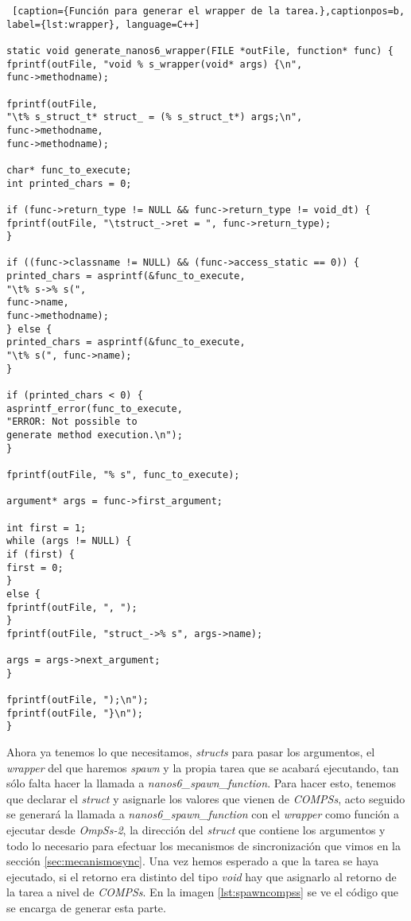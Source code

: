 \begin{lstlisting} [caption={Función para generar el wrapper de la tarea.},captionpos=b, label={lst:wrapper}, language=C++]

static void generate_nanos6_wrapper(FILE *outFile, function* func) {
fprintf(outFile, "void % s_wrapper(void* args) {\n", 
func->methodname);

fprintf(outFile, 
"\t% s_struct_t* struct_ = (% s_struct_t*) args;\n", 
func->methodname, 
func->methodname);

char* func_to_execute;
int printed_chars = 0;

if (func->return_type != NULL && func->return_type != void_dt) {
fprintf(outFile, "\tstruct_->ret = ", func->return_type);
}

if ((func->classname != NULL) && (func->access_static == 0)) {
printed_chars = asprintf(&func_to_execute, 
"\t% s->% s(", 
func->name, 
func->methodname);
} else {
printed_chars = asprintf(&func_to_execute, 
"\t% s(", func->name);
}

if (printed_chars < 0) {
asprintf_error(func_to_execute, 
"ERROR: Not possible to 
generate method execution.\n");
}

fprintf(outFile, "% s", func_to_execute);

argument* args = func->first_argument;

int first = 1;
while (args != NULL) {
if (first) {
first = 0;
}
else {
fprintf(outFile, ", ");
}
fprintf(outFile, "struct_->% s", args->name);

args = args->next_argument;
}

fprintf(outFile, ");\n");
fprintf(outFile, "}\n");
}  
\end{lstlisting}
\par\bigskip

Ahora ya tenemos lo que necesitamos, \textit{structs} para pasar los argumentos, el \textit{wrapper} del que haremos \textit{spawn} y la propia tarea que se acabará ejecutando, tan sólo falta hacer la llamada a \textit{nanos6\_spawn\_function}. Para hacer esto, tenemos que declarar el \textit{struct} y asignarle los valores que vienen de \textit{COMPSs}, acto seguido se generará la llamada a \textit{nanos6\_spawn\_function} con el \textit{wrapper} como función a ejecutar desde \textit{OmpSs-2}, la dirección del \textit{struct} que contiene los argumentos y todo lo necesario para efectuar los mecanismos de sincronización que vimos en la sección \ref{sec:mecanismosync}. Una vez hemos esperado a que la tarea se haya ejecutado, si el retorno era distinto del tipo \textit{void} hay que asignarlo al retorno de la tarea a nivel de \textit{COMPSs}. En la imagen \ref{lst:spawncompss} se ve el código que se encarga de generar esta parte.
\bigskip

